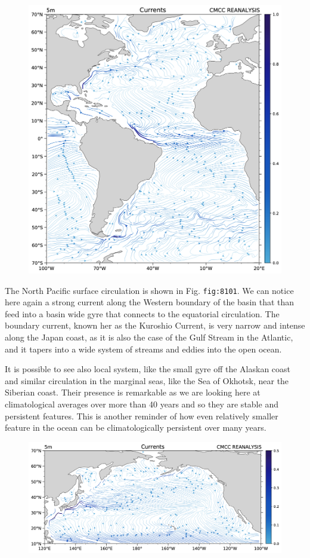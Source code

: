 \begin{figure}
	\centering
	\includegraphics[width = .7 \textwidth]{figs/GD/UVstream5mGLOBNA.png}
	\caption{} \label{fig:}
\end{figure}

The North Pacific surface circulation is shown in Fig.
\texttt{fig:8101}. We can notice here again a strong current along the
Western boundary of the basin that than feed into a basin wide gyre that
connects to the equatorial circulation. The boundary current, known her
as the Kuroshio Current, is very narrow and intense along the Japan
coast, as it is also the case of the Gulf Stream in the Atlantic, and it
tapers into a wide system of streams and eddies into the open ocean.

It is possible to see also local system, like the small gyre off the
Alaskan coast and similar circulation in the marginal seas, like the Sea
of Okhotsk, near the Siberian coast. Their presence is remarkable as we
are looking here at climatological averages over more than 40 years and
so they are stable and persistent features. This is another reminder of
how even relatively smaller feature in the ocean can be climatologically
persistent over many years.

\begin{figure}
	\centering
	\includegraphics[width = .7 \textwidth]{figs/GD/UVstream5mGLOBNP.png}
	\caption{} \label{fig:}
\end{figure}

